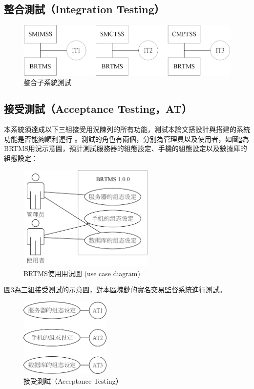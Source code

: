  		\subsection{整合測試（Integration Testing）}
 			\begin{figure}[htbp]
				\centering
				\includegraphics[width = 1\textwidth]{IntegrationTesting.png}
				\caption{整合子系統測試}\label{IntegrationTesting}
			\end{figure}

		\subsection{接受測試（Acceptance Testing，AT）}
		本系統須達成以下三組接受用況陳列的所有功能，測試本論文搭設計與搭建的系統功能是否能夠順利運行
		。測試的角色有兩個，分別為管理員以及使用者，如圖\ref{usecasediagram}為BRTMS用況示意圖，預計測試服務器的組態設定、手機的組態設定以及數據庫的組態設定：
			\begin{figure}[htbp]
				\centering
				\includegraphics[width = 0.6\textwidth]{usecasediagram.png}
				\caption{BRTMS使用用況圖 (use case diagram)}\label{usecasediagram}
			\end{figure}
		圖\ref{AcceptanceTesting}為三組接受測試的示意圖，對本區塊鏈的實名交易監督系統進行測試。
			\begin{figure}[htbp]
				\centering
				\includegraphics[width = 0.4\textwidth]{AcceptanceTesting.png}
				\caption{接受測試（Acceptance Testing）}\label{AcceptanceTesting}
			\end{figure}

